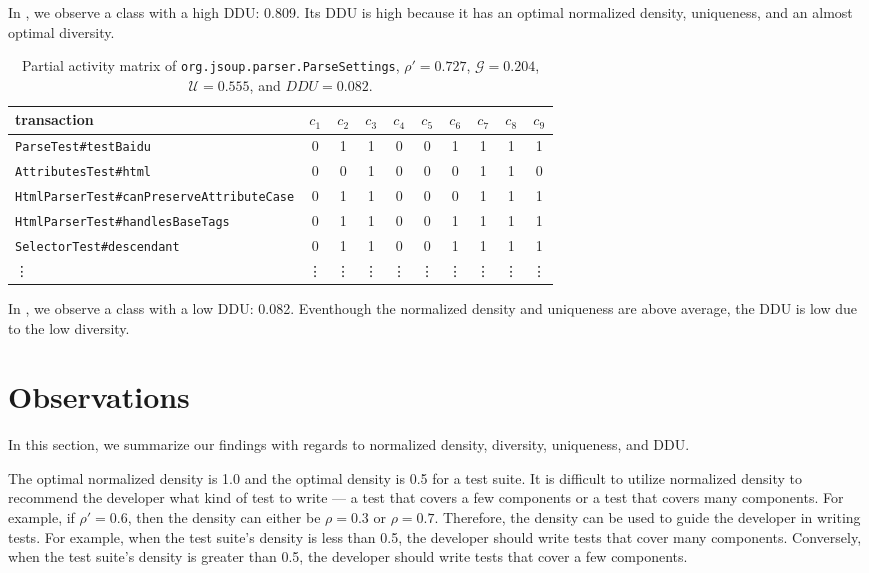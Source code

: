 \documentclass[twoside,a4paper,11pt]{memoir}
\begin{document}
In , we observe a class with a high DDU\@: 0.809.
Its DDU is high because it has an optimal normalized density, uniqueness, and an almost optimal diversity.

\begin{table}[]
\scriptsize
\centering
\caption{Partial activity matrix of \texttt{org.jsoup.parser.ParseSettings}, \(\rho' = 0.727 \), \(\mathcal{G} = 0.204 \), \(\mathcal{U} = 0.555 \), and \(DDU = 0.082\).}%
\label{tab:parsesettings}
\begin{tabular}{l|ccccccccc}
transaction & \(c_1 \) & \(c_2 \) & \(c_3 \) & \(c_4 \) & \(c_5 \) & \(c_6 \) & \(c_7 \) & \(c_8 \) & \(c_9 \) \\ \hline
\texttt{ParseTest\#testBaidu} & 0 & 1 & 1 & 0 & 0 & 1 & 1 & 1 & 1 \\
\texttt{AttributesTest\#html} & 0 & 0 & 1 & 0 & 0 & 0 & 1 & 1 & 0 \\
\texttt{HtmlParserTest\#canPreserveAttributeCase} & 0 & 1 & 1 & 0 & 0 & 0 & 1 & 1 & 1 \\
\texttt{HtmlParserTest\#handlesBaseTags} & 0 & 1 & 1 & 0 & 0 & 1 & 1 & 1 & 1 \\
\texttt{SelectorTest\#descendant} & 0 & 1 & 1 & 0 & 0 & 1 & 1 & 1 & 1 \\
\vdots & \vdots & \vdots & \vdots & \vdots & \vdots & \vdots & \vdots & \vdots & \vdots
\end{tabular}
\end{table}

In , we observe a class with a low DDU\@: 0.082.
Eventhough the normalized density and uniqueness are above average, the DDU is low due to the low diversity.

\section{Observations}
In this section, we summarize our findings with regards to normalized density, diversity, uniqueness, and DDU\@.

The optimal normalized density is 1.0 and the optimal density is 0.5 for a test suite.
It is difficult to utilize normalized density to recommend the developer what kind of test to write --- a test that covers a few components or a test that covers many components.
For example, if \(\rho' = 0.6 \), then the density can either be \(\rho = 0.3 \) or \(\rho = 0.7 \).
Therefore, the density can be used to guide the developer in writing tests.
For example, when the test suite's density is less than 0.5, the developer should write tests that cover many components.
Conversely, when the test suite's density is greater than 0.5, the developer should write tests that cover a few components.
\end{document}
